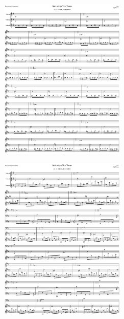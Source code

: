 \begin{figure}[H]                                             
{                                                             
  \setlength{\tabcolsep}{3.0pt}                               
  \setlength\cmidrulewidth{\heavyrulewidth} %
    \begin{subfigure}{0.5\textwidth}                            
  \includegraphics[width=6cm]{music/title_no_59_page_1001.png}%
    \end{subfigure}                                             
  \begin{subfigure}{0.5\textwidth}                            
  \includegraphics[width=6cm]{music/title_no_60_page_1001.png}%
    \end{subfigure}                                             
}                                                             
\end{figure}                                                  


